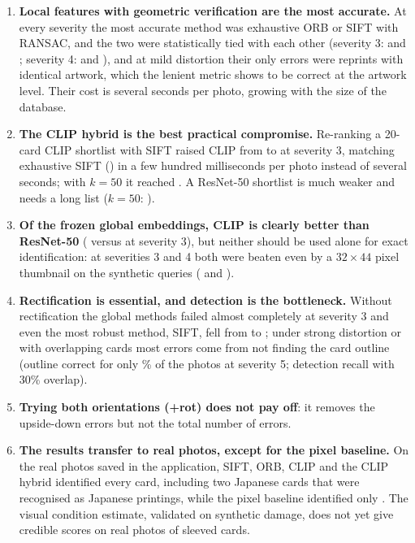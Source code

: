 \begin{enumerate}
  \item \textbf{Local features with geometric verification are the most accurate.} At every severity the most accurate method was exhaustive ORB or SIFT with RANSAC, and the two were statistically tied with each other (severity 3:  and ; severity 4:  and ), and at mild distortion their only errors were reprints with identical artwork, which the lenient metric shows to be correct at the artwork level. Their cost is several seconds per photo, growing with the size of the database.
  \item \textbf{The CLIP hybrid is the best practical compromise.} Re-ranking a 20-card CLIP shortlist with SIFT raised CLIP from  to  at severity 3, matching exhaustive SIFT () in a few hundred milliseconds per photo instead of several seconds; with $k=50$ it reached . A ResNet-50 shortlist is much weaker and needs a long list ($k=50$: ).
  \item \textbf{Of the frozen global embeddings, CLIP is clearly better than ResNet-50} ( versus  at severity 3), but neither should be used alone for exact identification: at severities 3 and 4 both were beaten even by a $32\times44$ pixel thumbnail on the synthetic queries ( and ).
  \item \textbf{Rectification is essential, and detection is the bottleneck.} Without rectification the global methods failed almost completely at severity 3 and even the most robust method, SIFT, fell from  to ; under strong distortion or with overlapping cards most errors come from not finding the card outline (outline correct for only \% of the photos at severity 5; detection recall  with 30\% overlap).
  \item \textbf{Trying both orientations (+rot) does not pay off}: it removes the upside-down errors but not the total number of errors.
  \item \textbf{The results transfer to real photos, except for the pixel baseline.} On the  real photos saved in the application, SIFT, ORB, CLIP and the CLIP hybrid identified every card, including two Japanese cards that were recognised as Japanese printings, while the pixel baseline identified only . The visual condition estimate, validated on synthetic damage, does not yet give credible scores on real photos of sleeved cards.
\end{enumerate}

